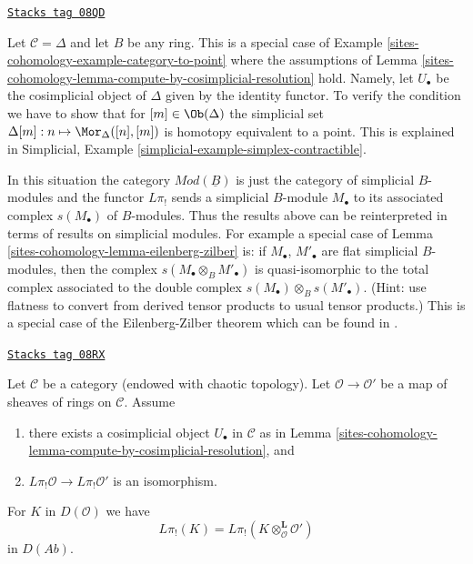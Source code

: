 \begin{remark}

\label{sites-cohomology-remark-simplicial-modules}
\href{https://stacks.math.columbia.edu/tag/08QD}{\texttt{Stacks tag 08QD}}

Let $\mathcal{C} = \Delta$ and let $B$ be any ring. This is a special
case of Example \ref{sites-cohomology-example-category-to-point} where the assumptions
of Lemma \ref{sites-cohomology-lemma-compute-by-cosimplicial-resolution} hold.
Namely, let $U_\bullet$ be the cosimplicial object of $\Delta$ given by
the identity functor. To verify the condition we have to show that for
$[m] \in \Ob(\Delta)$ the simplicial set
$\Delta[m] : n \mapsto \Mor_\Delta([n], [m])$ is homotopy equivalent
to a point. This is explained in
Simplicial, Example \ref{simplicial-example-simplex-contractible}.

\medskip\noindent
In this situation the category $\textit{Mod}(\underline{B})$
is just the category of simplicial $B$-modules and the
functor $L\pi_!$ sends a simplicial $B$-module $M_\bullet$ to its associated
complex $s(M_\bullet)$ of $B$-modules. Thus the results above can be
reinterpreted in terms of results on simplicial modules. For example
a special case of Lemma \ref{sites-cohomology-lemma-eilenberg-zilber} is:
if $M_\bullet$, $M'_\bullet$ are flat simplicial
$B$-modules, then the complex $s(M_\bullet \otimes_B M'_\bullet)$ is
quasi-isomorphic to the total complex associated to the double complex
$s(M_\bullet) \otimes_B s(M'_\bullet)$.
(Hint: use flatness to convert from derived tensor products to usual
tensor products.)
This is a special case of the Eilenberg-Zilber theorem
which can be found in \cite{Eilenberg-Zilber}.
\end{remark}

\begin{lemma}
\label{sites-cohomology-lemma-O-homology-qis}
\href{https://stacks.math.columbia.edu/tag/08RX}{\texttt{Stacks tag 08RX}}

Let $\mathcal{C}$ be a category (endowed with chaotic topology).
Let $\mathcal{O} \to \mathcal{O}'$ be a map of sheaves of rings on
$\mathcal{C}$. Assume
\begin{enumerate}
\item there exists a cosimplicial object $U_\bullet$ in $\mathcal{C}$
as in Lemma \ref{sites-cohomology-lemma-compute-by-cosimplicial-resolution}, and
\item $L\pi_!\mathcal{O} \to L\pi_!\mathcal{O}'$ is an isomorphism.
\end{enumerate}
For $K$ in $D(\mathcal{O})$ we have
$$
L\pi_!(K) = L\pi_!(K \otimes_\mathcal{O}^\mathbf{L} \mathcal{O}')
$$
in $D(\textit{Ab})$.
\end{lemma}

